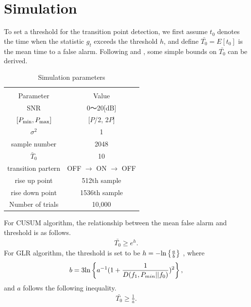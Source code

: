 \chapter[Simulation]{Simulation}
\label{chapter:Result}



To set a threshold for the transition point detection, we first assume $t_0$ denotes the time when the statistic $g_t$ exceeds the threshold $h$, and define $\bar{T_0}=E[t_0]$ is the mean time to a false alarm. Following \cite{ref:threshold_cusum} and \cite{ref:threshold_GLR}, some simple bounds on $\bar{T_0}$ can be derived.

\begin{table}[t]
\begin{center}
 \caption{\normalsize{Simulation parameters}}
 
\normalsize

  \begin{tabular}{c|c}
    & \\
    Parameter &Value \\ \hline
    SNR & 0〜20[dB] \\
    $[P_{{\rm min}},P_{{\rm max}}]$ & [$P$/2, 2$P$] \\
    $\sigma^2$ & 1 \\
    sample number & 2048 \\
    $\bar{T}_0$ & 10 \\
    transition partern & OFF $\rightarrow$ ON $\rightarrow$ OFF \\
    rise up point & 512th sample\\
    rise down point & 1536th sample\\
    Number of trials & 10,000 \\ \hline
  \end{tabular}
\label{parameter}
\end{center}
\end{table}
For CUSUM algorithm, the relationship between the mean false alarm and threshold is as follows.
\begin{eqnarray}
\bar{T_0} \geq e^h.
\end{eqnarray}
For GLR algorithm, the threshold is set to be $h=-{\rm ln}\left\{\frac{a}{b}\right\}$ , where 
\begin{eqnarray}
b=3{\rm ln}\left\{a^{-1}(1+\frac{1}{D(f_1,P_{min}||f_0)})^2\right\},
\end{eqnarray}
and $a$ follows the following inequality.
\begin{eqnarray}
\bar{T_0} \geq \frac{1}{a}.
\end{eqnarray}

